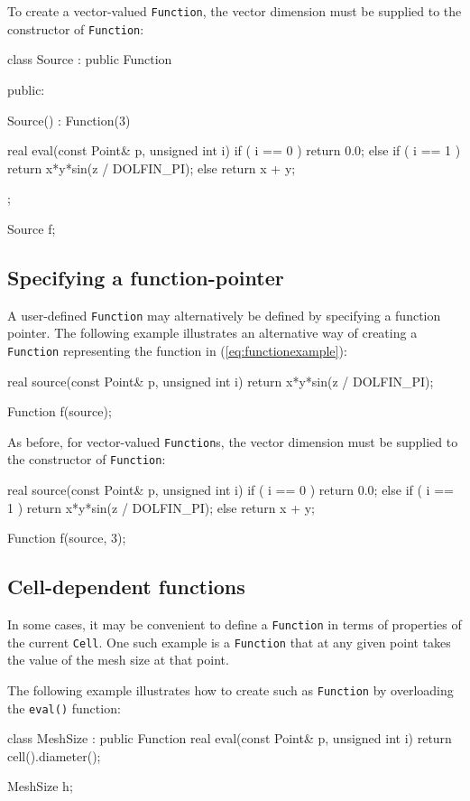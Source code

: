 To create a vector-valued \texttt{Function}, the vector dimension must
be supplied to the constructor of \texttt{Function}:
\begin{code}
class Source : public Function
{
public:

  Source() : Function(3) {}

  real eval(const Point& p, unsigned int i)
  {
    if ( i == 0 )
      return 0.0;
    else if ( i == 1 )
      return x*y*sin(z / DOLFIN_PI);
    else
      return x + y;
  }
};

Source f;
\end{code}

\subsection{Specifying a function-pointer}

A user-defined \texttt{Function} may alternatively be defined by
specifying a function pointer. The following example illustrates
an alternative way of creating a \texttt{Function} representing the
function in (\ref{eq:functionexample}):
\begin{code}
real source(const Point& p, unsigned int i)
{
  return x*y*sin(z / DOLFIN_PI);
}

Function f(source);
\end{code}

As before, for vector-valued \texttt{Function}s, the vector dimension
must be supplied to the constructor of \texttt{Function}:
\begin{code}
real source(const Point& p, unsigned int i)
{
  if ( i == 0 )
    return 0.0;
  else if ( i == 1 )
    return x*y*sin(z / DOLFIN_PI);
  else
    return x + y;
}

Function f(source, 3);
\end{code}

\subsection{Cell-dependent functions}

In some cases, it may be convenient to define a \texttt{Function} in
terms of properties of the current \texttt{Cell}. One such example is
a \texttt{Function} that at any given point takes the value of the
mesh size at that point.

The following example illustrates how to create such as
\texttt{Function} by overloading the \texttt{eval()} function:
\begin{code}
class MeshSize : public Function
{
  real eval(const Point& p, unsigned int i)
  {
    return cell().diameter();
  }
}

MeshSize h;
\end{code}

